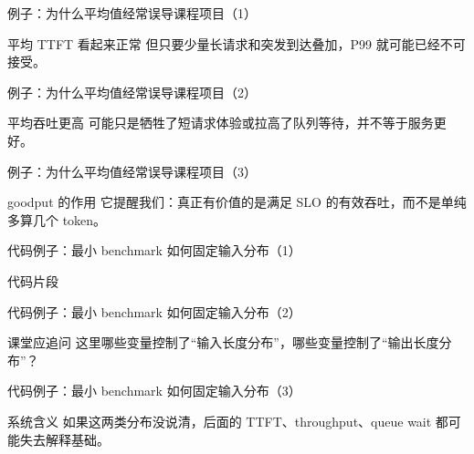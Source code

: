 \begin{frame}{例子：为什么平均值经常误导课程项目（1）}
\begin{block}{平均 TTFT 看起来正常}
    但只要少量长请求和突发到达叠加，P99 就可能已经不可接受。
  \end{block}
\end{frame}

\begin{frame}{例子：为什么平均值经常误导课程项目（2）}
\begin{block}{平均吞吐更高}
    可能只是牺牲了短请求体验或拉高了队列等待，并不等于服务更好。
  \end{block}
\end{frame}

\begin{frame}{例子：为什么平均值经常误导课程项目（3）}
\begin{block}{goodput 的作用}
    它提醒我们：真正有价值的是满足 SLO 的有效吞吐，而不是单纯多算几个 token。
  \end{block}
\end{frame}

\begin{frame}{代码例子：最小 benchmark 如何固定输入分布（1）}
\begin{block}{代码片段}
    {\ttfamily\small
    \par
    \par
    \par
    }
  \end{block}
\end{frame}

\begin{frame}{代码例子：最小 benchmark 如何固定输入分布（2）}
\begin{block}{课堂应追问}
    这里哪些变量控制了“输入长度分布”，哪些变量控制了“输出长度分布”？
  \end{block}
\end{frame}

\begin{frame}{代码例子：最小 benchmark 如何固定输入分布（3）}
\begin{block}{系统含义}
    如果这两类分布没说清，后面的 TTFT、throughput、queue wait 都可能失去解释基础。
  \end{block}
\end{frame}

